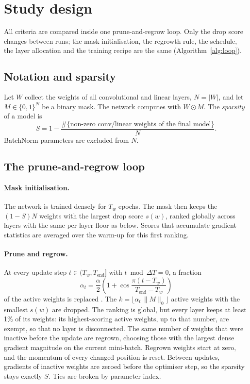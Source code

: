 \section{Study design}
\label{sec:methods}

All criteria are compared inside one prune-and-regrow loop. Only the drop score changes between runs; the mask initialisation, the regrowth rule, the schedule, the layer allocation and the training recipe are the same (Algorithm~\ref{alg:loop}).

\subsection{Notation and sparsity}

Let $W$ collect the weights of all convolutional and linear layers, $N=|W|$, and let $M\in\{0,1\}^{N}$ be a binary mask. The network computes with $W\odot M$. The \emph{sparsity} of a model is
\begin{equation}
S = 1 - \frac{\#\{\text{non-zero conv/linear weights of the final model}\}}{N}.
\label{eq:sparsity}
\end{equation}
BatchNorm parameters are excluded from $N$.

\subsection{The prune-and-regrow loop}
\label{sec:loop}

\paragraph{Mask initialisation.} The network is trained densely for $T_w$ epochs. The mask then keeps the $(1-S)N$ weights with the largest drop score $s(w)$, ranked globally across layers with the same per-layer floor as below. Scores that accumulate gradient statistics are averaged over the warm-up for this first ranking.

\paragraph{Prune and regrow.} At every update step $t\in(T_w, T_{\text{end}}]$ with $t \bmod \Delta T = 0$, a fraction
\begin{equation}
\alpha_t = \frac{\alpha}{2}\left(1+\cos\frac{\pi (t-T_w)}{T_{\text{end}}-T_w}\right)
\label{eq:alpha}
\end{equation}
of the active weights is replaced \cite{evci2020rigging}. The $k=\lfloor \alpha_t\, \|M\|_0\rfloor$ active weights with the smallest $s(w)$ are dropped. The ranking is global, but every layer keeps at least 1\% of its weights: its highest-scoring active weights, up to that number, are exempt, so that no layer is disconnected. The same number of weights that were inactive before the update are regrown, choosing those with the largest dense gradient magnitude on the current mini-batch. Regrown weights start at zero, and the momentum of every changed position is reset. Between updates, gradients of inactive weights are zeroed before the optimiser step, so the sparsity stays exactly $S$. Ties are broken by parameter index.


